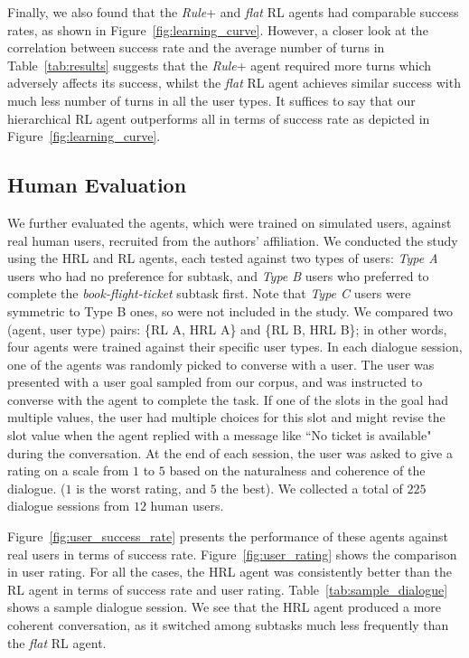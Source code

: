 \documentclass[11pt,letterpaper]{article}
\begin{document}
Finally, we also found that the \textit{Rule}+ and \textit{flat} RL agents had comparable success rates, as shown in Figure~\ref{fig:learning_curve}. However, a closer look at the correlation between success rate and the average number of turns in Table~\ref{tab:results} suggests that the \textit{Rule}+ agent required more turns which adversely affects its success, whilst the \textit{flat} RL agent achieves similar success with much less number of turns in all the user types. It suffices to say that our hierarchical RL agent outperforms all in terms of success rate as depicted in Figure~\ref{fig:learning_curve}.

\subsection{Human Evaluation}

We further evaluated the agents, which were trained on simulated users, against real human users, recruited from the authors' affiliation. We conducted the study using the HRL and RL agents, each tested against two types of users: \emph{Type A} users who had no preference for subtask, and \emph{Type B} users who preferred to complete the \textit{book-flight-ticket} subtask first. Note that \emph{Type C} users were symmetric to Type B ones, so were not included in the study.  We compared two (agent, user type) pairs: \{RL A, HRL A\} and \{RL B, HRL B\}; in other words, four agents were trained against their specific user types. In each dialogue session, one of the agents was randomly picked to converse with a user. %
The user was presented with a user goal sampled from our corpus, and was instructed to converse with the agent to complete the task. If one of the slots in the goal had multiple values, the user had multiple choices for this slot and might revise the slot value when the agent replied with a message like ``No ticket is available" during the conversation. At the end of each session, the user was asked to give a rating on a scale from $1$ to $5$ based on the naturalness and coherence of the dialogue. ($1$ is the worst rating, and $5$ the best). We collected a total of $225$ dialogue sessions from $12$ human users.

Figure~\ref{fig:user_success_rate} presents the performance of these agents against real users in terms of success rate. Figure~\ref{fig:user_rating} shows the comparison in user rating. For all the cases, the HRL agent was consistently better than the RL agent in terms of success rate and user rating. Table~\ref{tab:sample_dialogue} shows a sample dialogue session. We see that the HRL agent produced a more coherent conversation, as it switched among subtasks much less frequently than the \textit{flat} RL agent.
\end{document}
